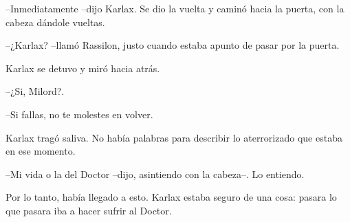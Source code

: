 --Inmediatamente --dijo Karlax. Se dio la vuelta y caminó hacia la puerta, con la cabeza dándole vueltas.

--¿Karlax? --llamó Rassilon, justo cuando estaba apunto de pasar por la puerta.



Karlax se detuvo y miró hacia atrás. 



--¿Si, Milord?.

--Si fallas, no te molestes en volver.



Karlax tragó saliva. No había palabras para describir lo aterrorizado que estaba en ese momento. 



--Mi vida o la del Doctor --dijo, asintiendo con la cabeza--. Lo entiendo.



Por lo tanto, había llegado a esto. Karlax estaba seguro de una cosa: pasara lo que pasara iba a hacer sufrir al Doctor.



